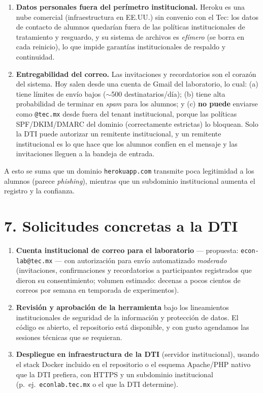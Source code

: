 \documentclass[11pt,letterpaper]{article}
\newcommand{\seccion}[1]{\section*{\color{tecblue}#1}}
\begin{document}
\begin{enumerate}[leftmargin=2em]
    \item \textbf{Datos personales fuera del perímetro institucional.} Heroku es una nube
    comercial (infraestructura en EE.UU.) sin convenio con el Tec: los datos de contacto de
    alumnos quedarían fuera de las políticas institucionales de tratamiento y resguardo, y
    su sistema de archivos es \emph{efímero} (se borra en cada reinicio), lo que impide
    garantías institucionales de respaldo y continuidad.
    \item \textbf{Entregabilidad del correo.} Las invitaciones y recordatorios son el corazón
    del sistema. Hoy salen desde una cuenta de Gmail del laboratorio, lo cual:
    (a) tiene límites de envío bajos ($\sim$500 destinatarios/día);
    (b) tiene alta probabilidad de terminar en \emph{spam} para los alumnos; y
    (c) \textbf{no puede} enviarse como \texttt{@tec.mx} desde fuera del tenant institucional,
    porque las políticas SPF/DKIM/DMARC del dominio (correctamente estrictas) lo bloquean.
    Solo la DTI puede autorizar un remitente institucional, y un remitente institucional es
    lo que hace que los alumnos confíen en el mensaje y las invitaciones lleguen a la
    bandeja de entrada.
\end{enumerate}

A esto se suma que un dominio \texttt{herokuapp.com} transmite poca legitimidad a los
alumnos (parece \emph{phishing}), mientras que un subdominio institucional aumenta el
registro y la confianza.

\seccion{7. Solicitudes concretas a la DTI}

\begin{enumerate}[leftmargin=2em]
    \item \textbf{Cuenta institucional de correo para el laboratorio} --- propuesta:
    \texttt{econ-lab@tec.mx} --- con autorización para envío automatizado \emph{moderado}
    (invitaciones, confirmaciones y recordatorios a participantes registrados que dieron su
    consentimiento; volumen estimado: decenas a pocos cientos de correos por semana en
    temporada de experimentos).
    \item \textbf{Revisión y aprobación de la herramienta} bajo los lineamientos
    institucionales de seguridad de la información y protección de datos. El código es
    abierto, el repositorio está disponible, y con gusto agendamos las sesiones técnicas
    que se requieran.
    \item \textbf{Despliegue en infraestructura de la DTI} (servidor institucional), usando
    el stack Docker incluido en el repositorio o el esquema Apache/PHP nativo que la DTI
    prefiera, con HTTPS y un subdominio institucional (p.~ej.\
    \texttt{econlab.tec.mx} o el que la DTI determine).
\end{enumerate}
\end{document}

